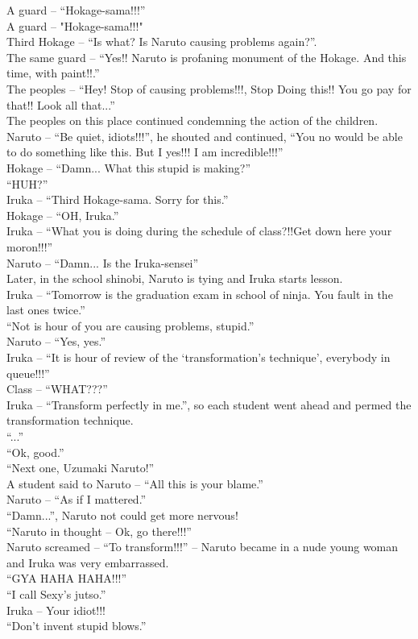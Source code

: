\documentclass[
10pt,				%
openright,			%
oneside,			%
a5paper,			%
brazil,				%
french,				%
english,			%
sumario=tradicional
]{abntex2}
\begin{document}
\noindent A guard -- \enquote{Hokage-sama!!!}\\
A guard -- "Hokage-sama!!!"\\
Third Hokage -- \enquote{Is what? Is Naruto causing problems again?}. \\
The same guard -- \enquote{Yes!! Naruto is profaning monument of the Hokage. And this time, with paint!!.}\\
The peoples -- \enquote{Hey! Stop of causing problems!!!, Stop Doing this!! You go pay for that!! Look all that...}\\
The peoples on this place continued  condemning the action of the children.\\
Naruto -- \enquote{Be quiet, idiots!!!}, he shouted and continued, \enquote{You no would be able  to do something like this. But I yes!!! I am incredible!!!}\\
Hokage -- \enquote{Damn... What this stupid is making?}\\
\enquote{HUH?}\\
Iruka -- \enquote{Third Hokage-sama. Sorry for this.}\\
Hokage -- \enquote{OH, Iruka.}\\
Iruka -- \enquote{What you is doing during  the schedule of class?!!Get down here your moron!!!}\\
Naruto -- \enquote{Damn... Is the Iruka-sensei}\\

Later, in the school shinobi, Naruto is tying and Iruka starts lesson.\\
Iruka -- \enquote{Tomorrow is the graduation exam in school of ninja. You fault in the last ones twice.}\\
\enquote{Not is hour of you are causing problems, stupid.}\\
Naruto -- \enquote{Yes, yes.}\\
Iruka -- \enquote{It is hour of review of the \enquote{transformation's technique}, everybody in queue!!!}\\
Class -- \enquote{WHAT???}\\
Iruka -- \enquote{Transform perfectly in me.}, so  each student went ahead and permed the transformation technique.\\
\enquote{...}\\
\enquote{Ok, good.}\\
\enquote{Next one, Uzumaki Naruto!}\\
A student said to Naruto -- \enquote{All this is your blame.}\\
Naruto -- \enquote{As if I mattered.}\\
\enquote{Damn...}, Naruto not could get more nervous!\\
\enquote{Naruto in thought -- Ok, go there!!!}\\
Naruto screamed -- \enquote{To transform!!!} -- Naruto became in a nude young woman and Iruka was very embarrassed.\\
\enquote{GYA HAHA HAHA!!!}\\
\enquote{I call Sexy's jutso.}\\
Iruka -- Your idiot!!!\\
\enquote{Don't invent stupid blows.}\\
\end{document}
